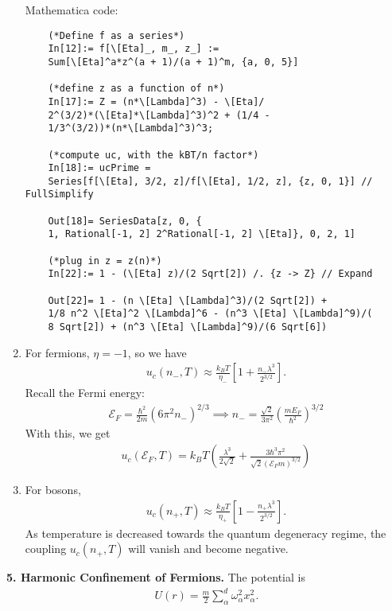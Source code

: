 \documentclass{article}
\theoremstyle{definition}
\newcommand{\al}{\alpha}
\newcommand{\f}[2]{\frac{#1}{#2}}
\newcommand{\lp}{\left(}
\newcommand{\rp}{\right)}
\newcommand{\lb}{\left[}
\newcommand{\rb}{\right]}
\begin{document}
\begin{enumerate}[label=(\alph*)]
	
	
	Mathematica code:
	\begin{lstlisting}
	(*Define f as a series*)
	In[12]:= f[\[Eta]_, m_, z_] := 
	Sum[\[Eta]^a*z^(a + 1)/(a + 1)^m, {a, 0, 5}]
	
	(*define z as a function of n*)
	In[17]:= Z = (n*\[Lambda]^3) - \[Eta]/
	2^(3/2)*(\[Eta]*\[Lambda]^3)^2 + (1/4 - 
	1/3^(3/2))*(n*\[Lambda]^3)^3;
	
	(*compute uc, with the kBT/n factor*)
	In[18]:= ucPrime = 
	Series[f[\[Eta], 3/2, z]/f[\[Eta], 1/2, z], {z, 0, 1}] // FullSimplify
	
	Out[18]= SeriesData[z, 0, {
	1, Rational[-1, 2] 2^Rational[-1, 2] \[Eta]}, 0, 2, 1]
	
	(*plug in z = z(n)*)
	In[22]:= 1 - (\[Eta] z)/(2 Sqrt[2]) /. {z -> Z} // Expand
	
	Out[22]= 1 - (n \[Eta] \[Lambda]^3)/(2 Sqrt[2]) + 
	1/8 n^2 \[Eta]^2 \[Lambda]^6 - (n^3 \[Eta] \[Lambda]^9)/(
	8 Sqrt[2]) + (n^3 \[Eta] \[Lambda]^9)/(6 Sqrt[6])
	\end{lstlisting}
	
	
	
	\item For fermions, $\eta = -1$, so we have
	\begin{align*}
	u_c(n_-,T) \approx \f{k_BT}{\eta_-}\lb   1  + \f{n_- \lambda^3}{2^{3/2}} \rb.
	\end{align*}
	Recall the Fermi energy:
	\begin{align*}
	\mathcal{E}_F = \f{\hbar^2}{2m} \lp 6\pi^2 n_- \rp^{2/3} \implies n_- = \f{\sqrt{2}}{3\pi^2} \lp \f{m E_F}{\hbar^2} \rp^{3/2}
	\end{align*}
	With this, we get
	\begin{align*}
	u_c(\mathcal{E}_F,T) = \boxed{k_BT \lp \f{ \lambda^3}{2\sqrt{2}} + \f{3\hbar^3  \pi^2}{\sqrt{2} (\mathcal{E}_F m)^{3/2}}\rp}
	\end{align*}
	
	\item For bosons, 
	\begin{align*}
	u_c(n_+,T) \approx \f{k_BT}{\eta_+}\lb   1  - \f{n_+ \lambda^3}{2^{3/2}} \rb.
	\end{align*}
	As temperature is decreased towards the quantum degeneracy regime, the coupling $u_c(n_+,T)$ will vanish and become negative. 
\end{enumerate}




\noindent \textbf{5. Harmonic Confinement of Fermions.} The potential is 
\begin{align*}
U(r) = \f{m}{2}\sum_\al^d \omega_\al^2 x_\al^2.
\end{align*}
\end{document}
